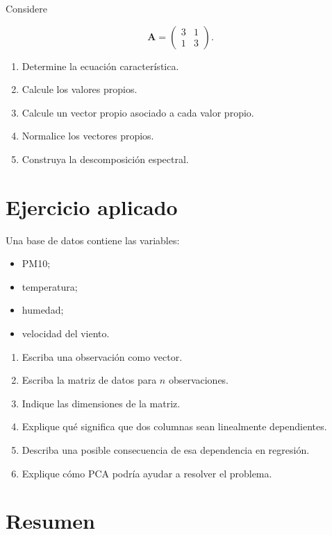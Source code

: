 \documentclass[
  spanish,
  11pt,
  letterpaper,
  DIV=11,
  numbers=noendperiod]{scrreprt}
\providecommand{\tightlist}{%
  \setlength{\itemsep}{0pt}\setlength{\parskip}{0pt}}
\theoremstyle{definition}
\theoremstyle{plain}
\theoremstyle{definition}
\theoremstyle{remark}
\begin{document}
Considere

\[
\mathbf{A}
=
\begin{pmatrix}
3 & 1\\
1 & 3
\end{pmatrix}.
\]

\begin{enumerate}
\def\labelenumi{\arabic{enumi}.}
\tightlist
\item
  Determine la ecuación característica.
\item
  Calcule los valores propios.
\item
  Calcule un vector propio asociado a cada valor propio.
\item
  Normalice los vectores propios.
\item
  Construya la descomposición espectral.
\end{enumerate}

\section{Ejercicio aplicado}\label{ejercicio-aplicado}

Una base de datos contiene las variables:

\begin{itemize}
\tightlist
\item
  PM10;
\item
  temperatura;
\item
  humedad;
\item
  velocidad del viento.
\end{itemize}

\begin{enumerate}
\def\labelenumi{\arabic{enumi}.}
\tightlist
\item
  Escriba una observación como vector.
\item
  Escriba la matriz de datos para \(n\) observaciones.
\item
  Indique las dimensiones de la matriz.
\item
  Explique qué significa que dos columnas sean linealmente dependientes.
\item
  Describa una posible consecuencia de esa dependencia en regresión.
\item
  Explique cómo PCA podría ayudar a resolver el problema.
\end{enumerate}

\section{Resumen}\label{resumen-1}
\end{document}
